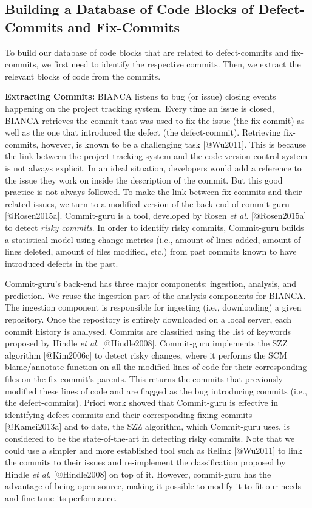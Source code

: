 \subsection{Building a Database of Code Blocks of Defect-Commits and
Fix-Commits}\label{sec:offline}

To build our database of code blocks that are related to defect-commits
and fix-commits, we first need to identify the respective commits. Then,
we extract the relevant blocks of code from the commits.

\textbf{Extracting Commits:} BIANCA listens to bug (or issue) closing
events happening on the project tracking system. Every time an issue is
closed, BIANCA retrieves the commit that was used to fix the issue (the
fix-commit) as well as the one that introduced the defect (the
defect-commit). Retrieving fix-commits, however, is known to be a
challenging task {[}@Wu2011{]}. This is because the link between the
project tracking system and the code version control system is not
always explicit. In an ideal situation, developers would add a reference
to the issue they work on inside the description of the commit. But this
good practice is not always followed. To make the link between
fix-commits and their related issues, we turn to a modified version of
the back-end of commit-guru {[}@Rosen2015a{]}. Commit-guru is a tool,
developed by Rosen \emph{et al.} {[}@Rosen2015a{]} to detect \emph{risky
commits}. In order to identify risky commits, Commit-guru builds a
statistical model using change metrics (i.e., amount of lines added,
amount of lines deleted, amount of files modified, etc.) from past
commits known to have introduced defects in the past.

Commit-guru's back-end has three major components: ingestion, analysis,
and prediction. We reuse the ingestion part of the analysis components
for BIANCA. The ingestion component is responsible for ingesting (i.e.,
downloading) a given repository. Once the repository is entirely
downloaded on a local server, each commit history is analysed. Commits
are classified using the list of keywords proposed by Hindle \emph{et
al.} {[}@Hindle2008{]}. Commit-guru implements the SZZ algorithm
{[}@Kim2006c{]} to detect risky changes, where it performs the SCM
blame/annotate function on all the modified lines of code for their
corresponding files on the fix-commit's parents. This returns the
commits that previously modified these lines of code and are flagged as
the bug introducing commits (i.e., the defect-commits). Priori work
showed that Commit-guru is effective in identifying defect-commits and
their corresponding fixing commits {[}@Kamei2013a{]} and to date, the
SZZ algorithm, which Commit-guru uses, is considered to be the
state-of-the-art in detecting risky commits. Note that we could use a
simpler and more established tool such as Relink {[}@Wu2011{]} to link
the commits to their issues and re-implement the classification proposed
by Hindle \emph{et al.} {[}@Hindle2008{]} on top of it. However,
commit-guru has the advantage of being open-source, making it possible
to modify it to fit our needs and fine-tune its performance.

